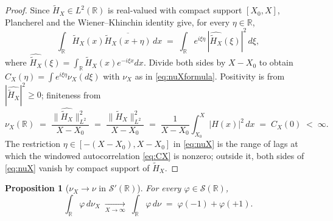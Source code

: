 \documentclass[11pt]{article}
\newtheorem{proposition}[theorem]{Proposition}
\theoremstyle{definition}
\theoremstyle{remark}
\begin{document}
\begin{proof}
Since $\widetilde H_X\in L^2(\mathbb{R})$ is real-valued with compact support $[X_0,X]$, Plancherel and the Wiener--Khinchin identity give, for every $\eta\in\mathbb{R}$,
\[
  \int_{\mathbb{R}}\widetilde H_X(x)\overline{\widetilde H_X(x+\eta)}\,dx
  \;=\;\int_{\mathbb{R}}e^{i\xi\eta}\,|\widehat{\widetilde H_X}(\xi)|^2\,d\xi,
\]
where $\widehat{\widetilde H_X}(\xi)=\int_{\mathbb{R}}\widetilde H_X(x)e^{-i\xi x}dx$. Divide both sides by $X-X_0$ to obtain $C_X(\eta)=\int e^{i\xi\eta}\nu_X(d\xi)$ with $\nu_X$ as in \eqref{eq:nuXformula}. Positivity is from $|\widehat{\widetilde H_X}|^2\ge 0$; finiteness from
\[
  \nu_X(\mathbb{R})\;=\;\frac{\|\widehat{\widetilde H_X}\|_{L^2}^2}{X-X_0}\;=\;\frac{\|\widetilde H_X\|_{L^2}^2}{X-X_0}\;=\;\frac{1}{X-X_0}\int_{X_0}^{X}|H(x)|^2\,dx\;=\;C_X(0)\;<\;\infty.
\]
The restriction $\eta\in[-(X-X_0),X-X_0]$ in \eqref{eq:nuX} is the range of lags at which the windowed autocorrelation \eqref{eq:CX} is nonzero; outside it, both sides of \eqref{eq:nuX} vanish by compact support of $\widetilde H_X$.
\end{proof}

\begin{proposition}[$\nu_X\to\nu$ in $\mathcal{S}'(\mathbb{R})$]\label{prop:weakstar}
For every $\varphi\in\mathcal{S}(\mathbb{R})$,
\begin{equation}\label{eq:weakstar}
  \int_{\mathbb{R}}\varphi\,d\nu_X\;\xrightarrow[X\to\infty]{}\;\int_{\mathbb{R}}\varphi\,d\nu\;=\;\varphi(-1)+\varphi(+1).
\end{equation}
\end{proposition}
\end{document}

